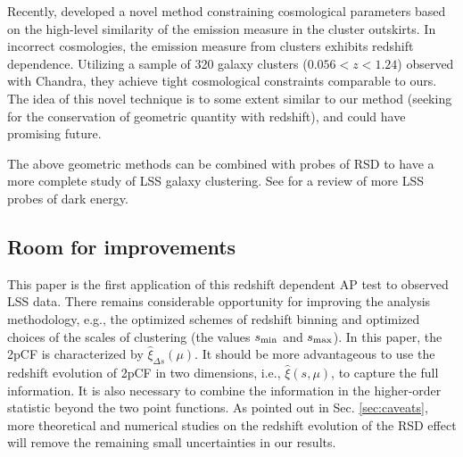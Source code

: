 \documentclass[iop]{emulateapj}
\begin{document}
Recently, \cite{MS2016} developed a novel method 
constraining cosmological parameters based on the high-level similarity of the emission measure in the cluster outskirts.
In incorrect cosmologies, the emission measure from clusters exhibits redshift dependence.
Utilizing a sample of 320 galaxy clusters ($0.056<z<1.24$) observed with Chandra,
they achieve tight cosmological constraints comparable to ours.
The idea of this novel technique is to some extent similar to our method 
(seeking for the conservation of geometric quantity with redshift),
and could have promising future.

The above geometric methods can be combined with probes of RSD 
\citep{Guzzo2008,Blake2011a,Beutler2012,Reid2012b,Samushia2012,GM2016b,Li2016} 
to have a more complete study of LSS galaxy clustering.
See \cite{DHW2013} for a review of more LSS probes of dark energy.





\subsection{Room for improvements}

This paper is the first application of this redshift dependent AP test to observed LSS data.
There remains considerable opportunity for improving the analysis methodology,
e.g., the optimized schemes of redshift binning and 
optimized choices of the scales of clustering (the values $s_{\rm min}$ and $s_{\rm max}$).
In this paper, the 2pCF is characterized by $\hat \xi_{\Delta s}(\mu)$.
It should be more advantageous to use 
the redshift evolution of 2pCF in two dimensions, i.e., $\hat \xi(s,\mu)$, 
to capture the full information.
It is also necessary to combine the 
information in the higher-order
statistic beyond the two point functions.
As pointed out in Sec. \ref{sec:caveats},
more theoretical and numerical studies on the 
redshift evolution of the RSD effect 
will remove the remaining small 
uncertainties in our results.
\end{document}
